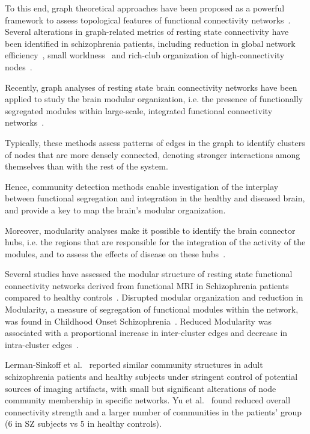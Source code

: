 To this end, graph theoretical approaches have been proposed as a powerful framework to assess topological features of functional connectivity networks~\cite{bassett2006,bullmore2009,kaiser2011,stam2007}.
Several alterations in graph-related metrics of resting state connectivity have been identified in schizophrenia patients, including reduction in global network efficiency~\cite{liu2008,bullmore2009,bassett2008}, small worldness~\cite{liu2008,anderson2013,yu2011} and rich-club organization of high-connectivity nodes~\cite{vandenheuvel2013}.


Recently, graph analyses of resting state brain connectivity networks have been applied to study the brain modular organization, i.e.
the presence of functionally segregated modules within large-scale, integrated functional connectivity networks~\cite{salvador2005a}.

Typically, these methods assess patterns of edges in the graph to identify clusters of nodes that are more densely connected, denoting stronger interactions among themselves than with the rest of the system.

Hence, community detection methods enable investigation of the interplay between functional segregation and integration in the healthy and diseased brain, and provide a key to map the brain's modular organization.

Moreover, modularity analyses make it possible to identify the brain connector hubs, i.e. the regions that are responsible for the integration of the activity of the modules, and to assess the effects of disease on these hubs~\cite{vandenheuvel2013a}.

Several studies have assessed the modular structure of resting state functional connectivity networks derived from functional MRI in Schizophrenia patients compared to healthy controls~\cite{liu2008,alexander-bloch2010,lerman-sinkoff2016}.
Disrupted modular organization and reduction in Modularity, a measure of segregation of functional modules within the network, was found in Childhood Onset Schizophrenia~\cite{alexander-bloch2010}.
Reduced Modularity was associated with a proportional increase in inter-cluster edges and decrease in intra-cluster edges~\cite{alexander-bloch2012}.

Lerman-Sinkoff et al.~\cite{lerman-sinkoff2016} reported similar community structures in adult schizophrenia patients and healthy subjects under stringent control of potential sources of imaging artifacts, with small but significant alterations of node community membership in specific networks.
Yu et al.~\cite{yu2012} found reduced overall connectivity strength and a larger number of communities in the patients' group (6 in SZ subjects vs 5 in healthy controls).

